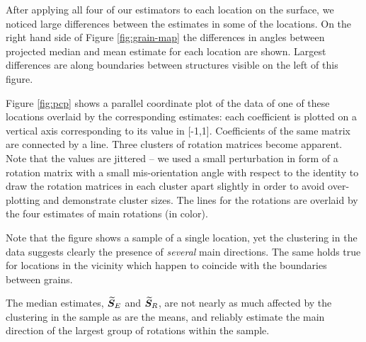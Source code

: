 After applying all four of our estimators to each location on the surface, we noticed large differences between the estimates in some of the locations. On the right hand side of Figure \ref{fig:grain-map} the differences in angles between projected median and mean estimate for each location are shown. Largest differences are along boundaries between structures visible on the left of this figure.

Figure \ref{fig:pcp} shows a parallel coordinate plot of the data of one of these locations overlaid by the corresponding estimates: each coefficient is plotted on a vertical axis corresponding to its value in [-1,1]. Coefficients of the same matrix are connected by a line. Three clusters of rotation matrices become apparent. Note that the values are jittered -- we used a small perturbation in form of a rotation matrix with a small mis-orientation angle with respect to the identity to draw the rotation matrices in each cluster apart slightly in order to avoid over-plotting and demonstrate cluster sizes. The lines for the rotations are overlaid by the four estimates of main rotations (in color).

 Note that the figure shows a sample of a single location, yet the clustering in the data suggests clearly the presence of \emph{several} main directions. The same holds true for locations in the vicinity which happen to coincide with the boundaries between grains. 

The  median estimates, ${\widetilde{\bm S}_E}$  and ${\widetilde{\bm S}_R}$, are not nearly as much affected by the clustering in the sample as are the means, and reliably estimate the main direction of the largest group of rotations within the sample.


